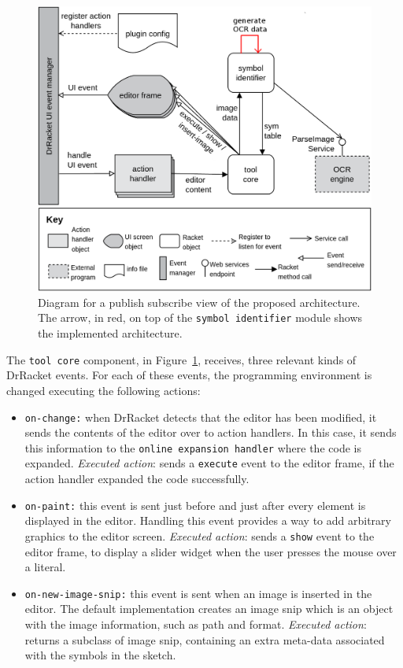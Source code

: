 \begin{figure}[!h]
    \centering
    \includegraphics[scale=0.15]{images/solution}
    \caption{Diagram for a publish subscribe view of the proposed architecture. The arrow, in red, on top of the \texttt{symbol identifier} module shows the implemented architecture.}
    \label{fig:solution}
\end{figure}

The \texttt{tool core} component, in Figure~\ref{fig:solution}, receives, three relevant kinds of DrRacket events. For each of these events, the programming environment is changed executing the following actions:

\begin{itemize}
    \item \texttt{on-change:} when DrRacket detects that the editor has been modified, it sends the contents of the editor over to action handlers.    In this case, it sends this information to the \texttt{online expansion handler} where the code is expanded. \textit{Executed action}: sends a \texttt{execute} event to the editor frame, if the action handler expanded the code successfully. 

    \item \texttt{on-paint:} this event is sent just before and just after every element is displayed in the editor. Handling this event provides a way to add arbitrary graphics to the editor screen. \textit{Executed action}: sends a \texttt{show} event to the editor frame, to display a slider widget when the user presses the mouse over a literal.

    \item \texttt{on-new-image-snip:} this event is sent when an image is inserted in the editor. The default implementation creates an image snip which is an object with the image information, such as path and format. \textit{Executed action}:  returns a subclass of image snip, containing an extra meta-data associated with the symbols in the sketch.
\end{itemize}


